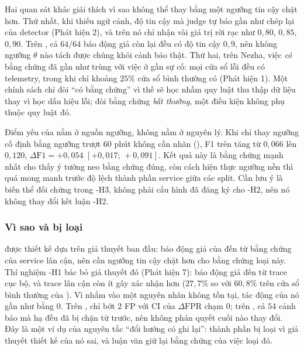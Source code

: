 Hai quan sát khác giải thích vì sao không thể thay  bằng một ngưỡng tin cậy chặt hơn. Thứ nhất, khi thiếu ngữ cảnh, độ tin cậy mà judge tự báo gần như chép lại  của detector (Phát hiện 2), và trên  nó chỉ nhận vài giá trị rời rạc như $0{,}80$, $0{,}85$, $0{,}90$. Trên , cả $64/64$ báo động giả còn lại đều có độ tin cậy $0{,}9$, nên không ngưỡng $\theta$ nào tách được chúng khỏi cảnh báo thật. %
Thứ hai, trên Nezha, việc \emph{có} bằng chứng đã gần như trùng với việc ở gần sự cố: mọi cửa sổ lỗi đều có telemetry, trong khi chỉ khoảng $25\%$ cửa sổ bình thường có (Phát hiện 1). Một chính sách chỉ đòi ``có bằng chứng'' vì thế sẽ học nhầm quy luật thu thập dữ liệu thay vì học dấu hiệu lỗi;  đòi bằng chứng \emph{bất thường}, một điều kiện không phụ thuộc quy luật đó.

Điểm yếu của  nằm ở nguồn ngưỡng, không nằm ở nguyên lý. Khi chỉ thay ngưỡng  cố định bằng ngưỡng trượt 60 phút không cần nhãn (), F1 trên  tăng từ $0{,}066$ lên $0{,}120$, $\Delta\text{F1} = +0{,}054$ $[+0{,}017;\, +0{,}091]$. %
Kết quả này là bằng chứng mạnh nhất cho thấy ý tưởng neo bằng chứng đúng, còn cách hiện thực ngưỡng nền thì quá mong manh trước độ lệch thành phần service giữa các split. Cần lưu ý  là biến thể đối chứng trong \hyp{H3}, không phải cấu hình đã đăng ký cho \hyp{H2}, nên nó không thay đổi kết luận \hyp{H2}.

\subsubsection{Vì sao  và  bị loại}
\label{sec:ch7-c2-c4}

 được thiết kế dựa trên giả thuyết ban đầu: báo động giả của  đến từ bằng chứng của service lân cận, nên cần ngưỡng tin cậy chặt hơn cho bằng chứng loại này. Thí nghiệm \hyp{H1} bác bỏ giả thuyết đó (Phát hiện 7): báo động giả đến từ trace cục bộ, và trace lân cận còn ít gây xác nhận hơn ($27{,}7\%$ so với $60{,}8\%$ trên cửa sổ bình thường của ). Vì  nhắm vào một nguyên nhân không tồn tại, tác động của nó gần như bằng $0$. Trên ,  chỉ bớt $2$ FP với CI của $\Delta\text{FPR}$ chạm $0$; trên , cả $54$ cảnh báo mà  hạ đều đã bị  chặn từ trước, nên không phán quyết cuối nào thay đổi. %
Đây là một ví dụ của nguyên tắc ``đổi hướng có ghi lại'': thành phần bị loại vì giả thuyết thiết kế của nó sai, và luận văn giữ lại bằng chứng của việc loại đó.

